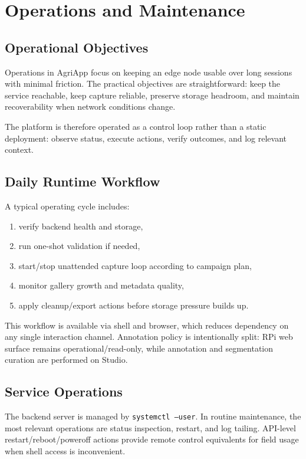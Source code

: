 \section{Operations and Maintenance}

\subsection{Operational Objectives}
Operations in AgriApp focus on keeping an edge node usable over long sessions with minimal friction. The practical objectives are straightforward: keep the service reachable, keep capture reliable, preserve storage headroom, and maintain recoverability when network conditions change.

The platform is therefore operated as a control loop rather than a static deployment: observe status, execute actions, verify outcomes, and log relevant context.

\subsection{Daily Runtime Workflow}
A typical operating cycle includes:
\begin{enumerate}
  \item verify backend health and storage,
  \item run one-shot validation if needed,
  \item start/stop unattended capture loop according to campaign plan,
  \item monitor gallery growth and metadata quality,
  \item apply cleanup/export actions before storage pressure builds up.
\end{enumerate}

This workflow is available via shell and browser, which reduces dependency on any single interaction channel.
Annotation policy is intentionally split: RPi web surface remains operational/read-only, while annotation and segmentation curation are performed on Studio.

\subsection{Service Operations}
The backend server is managed by \texttt{systemctl --user}. In routine maintenance, the most relevant operations are status inspection, restart, and log tailing. API-level restart/reboot/poweroff actions provide remote control equivalents for field usage when shell access is inconvenient.

